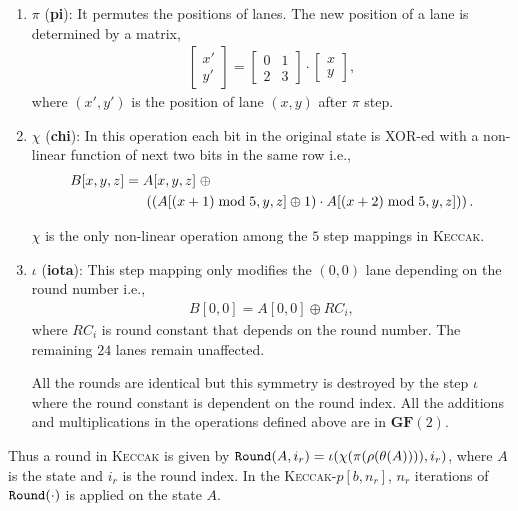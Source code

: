 \documentclass[runningheads]{llncs}
\newcommand{\KECCAK}{\mbox{\textsc{Keccak}}}
\newcommand{\Keccak}{\mbox{\textsc{Keccak}}}
\begin{document}
\begin{enumerate}
    \vskip5pt
    \item $\pi$ ({\bf pi}): It permutes the positions of lanes. The new position of a lane is determined by a matrix, 
    \begin{align}
    \begin{bmatrix} x'\\ y'\end{bmatrix} = 
    \begin{bmatrix} 0 & 1 \\ 2 &  3 \end{bmatrix} \cdot \begin{bmatrix} x\\ y\end{bmatrix},
    \end{align}
    where $(x', y')$ is the position of lane $(x, y)$ after $\pi$ step.
    \vskip5pt
    \item $\chi$ ({\bf chi}): In this operation each bit in the original state is XOR-ed with a non-linear function of next two bits in the same row i.e.,
    \begin{align}\nonumber
        B[x, y, z] &=  A[x, y, z] \;\oplus \\
        & \hspace{0.5cm} \left( \left(A[ (x + 1 )\bmod 5, y, z] \oplus 1\right) \cdot  A[ (x + 2) \bmod 5, y, z] ) \right).
    \end{align}
    
    $\chi$ is the only non-linear operation among the $5$ step mappings in \KECCAK{}.
    
    \vskip5pt
    \item $\iota$ ({\bf iota}): This step mapping only modifies the $(0, 0)$ lane depending on the round number i.e., 
    \begin{align}
       B[0, 0] = A[0, 0] \oplus RC_i,
   \end{align}
    where $RC_i$ is round constant that depends on the round number. The remaining $24$ lanes remain unaffected.
    
    All the rounds are identical but this symmetry is destroyed by the step $\iota$ where the round constant is dependent on the round index.
    All the additions and multiplications in the operations defined above are in $\textbf{GF}(2)$.
\end{enumerate}

Thus a round in \Keccak{} is given by ${\tt Round}(A, i_r) = \iota( \chi( \pi ( \rho ( \theta ( A ) ) ) ) , i_r)$, where $A$ is the state and $i_r$ is the round index. In the \Keccak-$p[b, n_r]$, $n_r$ iterations of ${\tt Round}(\cdot)$ is applied on the state $A$.
\end{document}
